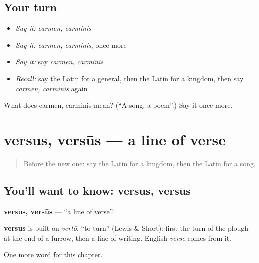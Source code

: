 \subsection*{Your turn}
\begin{itemize}
\raggedright
  \item \emph{Say it:} \emph{carmen, carminis}
  \item \emph{Say it:} \emph{carmen, carminis}, once more
  \item \emph{Say it:} say \emph{carmen, carminis}
  \item \emph{Recall:} say the Latin for a general, then the Latin for a kingdom, then say \emph{carmen, carminis} again
\end{itemize}

\begin{tcolorbox}[breakable,colback=teal!4,colframe=teal!35!black,title={Before you move on}]
What does carmen, carminis mean? (\textquotedblleft{}A song, a poem\textquotedblright{}.) Say it once more.
\end{tcolorbox}
\section[versus, versūs]{versus, versūs — a line of verse}

\label{lesson:LA-C246-versus}



\begin{quote}
Before the new one: say the Latin for a kingdom, then the Latin for a song.
\end{quote}

\subsection*{You'll want to know: versus, versūs}
\textbf{versus, versūs} — \textquotedblleft{}a line of verse\textquotedblright{}.

\begin{cousinweb}
\textbf{versus} is built on \emph{vertō}, \textquotedblleft{}to turn\textquotedblright{} (Lewis \& Short): first the turn of the plough at the end of a furrow, then a line of writing. English \emph{verse} comes from it.
\end{cousinweb}

\begin{grammarlens}[title={What you've built}]
One more word for this chapter.
\end{grammarlens}

